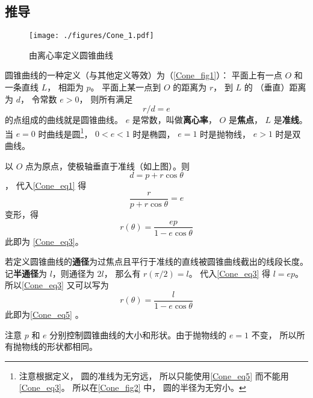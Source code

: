 \subsection{推导}

\begin{figure}[ht]
\centering
\texttt{[image: ./figures/Cone\_1.pdf]}
\caption{由离心率定义圆锥曲线}\label{Cone_fig1}
\end{figure}

圆锥曲线的一种定义（与其他定义等效）为（\autoref{Cone_fig1}）：
平面上有一点 $O$ 和一条直线 $L$， 相距为 $p$。 
平面上某一点到 $O$ 的距离为 $r$， 到 $L$ 的
（垂直）距离为 $d$， 令常数 $e > 0$， 则所有满足
\begin{equation}\label{Cone_eq1}
r/d = e
\end{equation}
的点组成的曲线就是圆锥曲线。 $e$ 是常数，叫做\textbf{离心率}， $O$ 是\textbf{焦点}， $L$ 是\textbf{准线}。 当 $e = 0$ 时曲线是圆\footnote{注意根据定义， 圆的准线为无穷远， 所以只能使用\autoref{Cone_eq5} 而不能用\autoref{Cone_eq3}。 所以在\autoref{Cone_fig2} 中， 圆的半径为无穷小。}， $0 < e < 1$ 时是椭圆， $e = 1$ 时是抛物线， $e > 1$ 时是双曲线。

以 $O$ 点为原点，使极轴垂直于准线（如上图）。则 $$d = p + r \cos \theta $$， 代入\autoref{Cone_eq1} 得
\begin{equation}\label{Cone_eq2}
\frac{r}{p + r \cos \theta } = e
\end{equation}
变形，得
\begin{equation}
r(\theta) = \frac{ep}{1 - e\cos \theta }
\end{equation}
此即为 \autoref{Cone_eq3}。

若定义圆锥曲线的\textbf{通径}为过焦点且平行于准线的直线被圆锥曲线截出的线段长度。 记\textbf{半通径}为 $l$，则通径为 $2l$， 那么有 $r(\pi /2) = l$。 代入\autoref{Cone_eq3} 得 $l = ep$。 所以\autoref{Cone_eq3} 又可以写为
\begin{equation}\label{Cone_eq4}
r(\theta)  = \frac{l}{1 - e\cos \theta }
\end{equation}
此即为\autoref{Cone_eq5} 。

注意 $p$ 和 $e$ 分别控制圆锥曲线的大小和形状。由于抛物线的 $e = 1$ 不变， 所以所有抛物线的形状都相同。
